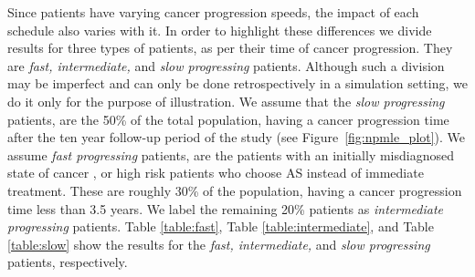 Since patients have varying cancer progression speeds, the impact of each schedule also varies with it. In order to highlight these differences we divide results for three types of patients, as per their time of cancer progression. They are \textit{fast, intermediate,} and \textit{slow progressing} patients. Although such a division may be imperfect and can only be done retrospectively in a simulation setting, we do it only for the purpose of illustration. We assume that the \textit{slow progressing} patients, are the 50\% of the total population, having a cancer progression time after the ten year follow-up period of the study (see Figure~\ref{fig:npmle_plot}). We assume \textit{fast progressing} patients, are the patients with an initially misdiagnosed state of cancer \citep{cooperberg2011outcomes}, or high risk patients who choose AS instead of immediate treatment. These are roughly 30\% of the population, having a cancer progression time less than 3.5 years. We label the remaining 20\% patients as \textit{intermediate progressing} patients.  Table \ref{table:fast}, Table \ref{table:intermediate}, and Table \ref{table:slow} show the results for the \textit{fast, intermediate,} and \textit{slow progressing} patients, respectively.

